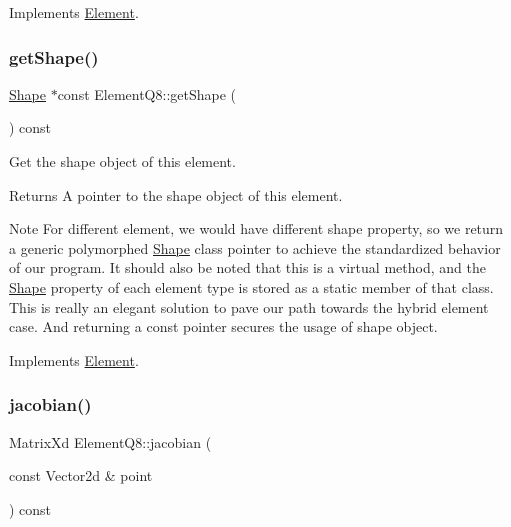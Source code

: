 Implements \mbox{\hyperlink{class_element_ae3c88315d1a30addff6379a9089465ca}{Element}}.

\mbox{\label{class_element_q8_a06118e8d0c0a0cb247c249f22e11eeaf}} 
\subsubsection{\texorpdfstring{get\+Shape()}{getShape()}}
{\footnotesize\ttfamily \mbox{\hyperlink{class_shape}{Shape}} $\ast$const Element\+Q8\+::get\+Shape (\begin{DoxyParamCaption}{ }\end{DoxyParamCaption}) const\hspace{0.3cm}{\ttfamily [virtual]}}



Get the shape object of this element. 

\begin{DoxyReturn}{Returns}
A pointer to the shape object of this element.
\end{DoxyReturn}
\begin{DoxyNote}{Note}
For different element, we would have different shape property, so we return a generic polymorphed \mbox{\hyperlink{class_shape}{Shape}} class pointer to achieve the standardized behavior of our program. It should also be noted that this is a virtual method, and the \mbox{\hyperlink{class_shape}{Shape}} property of each element type is stored as a static member of that class. This is really an elegant solution to pave our path towards the hybrid element case. And returning a const pointer secures the usage of shape object. 
\end{DoxyNote}


Implements \mbox{\hyperlink{class_element_a54c5c297abff4ac3abacd815342a9645}{Element}}.

\mbox{\label{class_element_q8_ae23bf98a466daa224224da495d5724ff}} 
\subsubsection{\texorpdfstring{jacobian()}{jacobian()}}
{\footnotesize\ttfamily Matrix\+Xd Element\+Q8\+::jacobian (\begin{DoxyParamCaption}\item[{const Vector2d \&}]{point }\end{DoxyParamCaption}) const\hspace{0.3cm}{\ttfamily [virtual]}}



